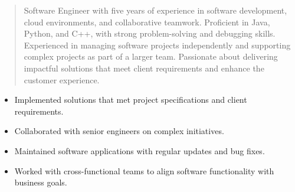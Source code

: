 



\makecvheader

\begin{quote}
  \noindent
  Software Engineer with five years of experience in software development, cloud environments, and collaborative teamwork. Proficient in Java, Python, and C++, with strong problem-solving and debugging skills. Experienced in managing software projects independently and supporting complex projects as part of a larger team. Passionate about delivering impactful solutions that meet client requirements and enhance the customer experience.
\end{quote}

\par\smallskip
\noindent
\begin{minipage}{20cm}
  \begin{minipage}{9.75cm}
    \begin{itemize}
      \item Implemented solutions that met project specifications and client requirements.
      \item Collaborated with senior engineers on complex initiatives.
    \end{itemize}
  \end{minipage}
  \hfill
  \begin{minipage}{9.75cm}
    \begin{itemize}
      \item Maintained software applications with regular updates and bug fixes.
      \item Worked with cross-functional teams to align software functionality with business goals.
    \end{itemize}
  \end{minipage}
\end{minipage}
\par\smallskip
\divider

